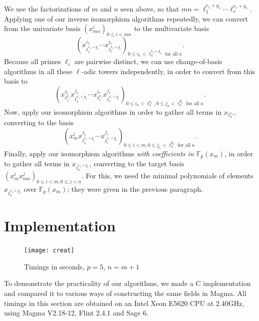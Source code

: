 \documentclass{sig-alternate}
\def\F {\ensuremath{\mathbb{F}}}
\newcounter{algo}
\begin{document}
We use the factorizations of $m$ and $n$ seen above, so that $mn =
\ell_1^{e_1+g_1} \cdots \ell_r^{e_r + g_r}$. Applying one of our
inverse isomorphism algorithms repeatedly, we can convert
from the univariate basis $(x_{mn}^i)_{0 \le i < mn}$ to
the multivariate basis 
$$(x^{i_1}_{\ell_1^{e_1+g_1}}\cdots x^{i_r}_{\ell_r^{e_r+g_r}})_{ 0\le i_\kappa < \ell_\kappa^{e_\kappa+g_\kappa}  \text{~for all $\kappa$}}.$$
Because all primes $\ell_i$ are pairwise distinct, we can use 
change-of-basis algorithms in all these $\ell$-adic towers independently, in
order to convert from this basis to
$$(x^{i_1}_{\ell_1^{e_1}} x^{j_1}_{\ell_1^{e_1+g_1}} 
\cdots x^{i_r}_{\ell_r^{e_r}} x^{j_r}_{\ell_r^{e_r+g_r}})_{ 
  0\le i_\kappa < \ell_\kappa^{e_\kappa},   0\le j_\kappa < \ell_\kappa^{g_\kappa} \text{~for all $\kappa$}}.$$
Now, apply our isomorphism algorithms in order to
gather all terms in $x_{\ell_\kappa^{e_\kappa}}$, converting
to the basis
$$(x_m^i x^{j_1}_{\ell_1^{e_1+g_1}} \cdots
x^{j_r}_{\ell_r^{e_r+g_r}})_{ 0\le i < m, 0\le j_\kappa <
  \ell_\kappa^{g_\kappa} \text{~for all $\kappa$}}.$$ Finally, apply
our isomorphism algorithms {\em with coefficients in $\F_p(x_m)$}, in
order to gather all terms in $x_{\ell_\kappa^{e_\kappa+g_\kappa}}$,
converting to the target basis $(x_m^i x_{mn}^j)_{0 \le i < m, 0 \le j
  < n}$.  For this, we need the minimal polynomials of elements
$x_{\ell_\kappa^{e_\kappa+g_\kappa}}$ over $\F_p(x_m)$;
they were given in the previous paragraph.



\section{Implementation}\label{sec:implem}

\begin{figure}
  \centering
  \texttt{[image: creat]}
  \caption{Timings in seconds, $p=5$, $n=m+1$}
  \label{fig:bench}
\vspace{-4ex}
\end{figure}

To demonstrate the practicality of our algorithms, we made a C
implementation and compared it to various ways of constructing the
same fields in Magma. All timings in this section are obtained on an
Intel Xeon E5620 CPU at 2.40GHz, using Magma V2.18-12, Flint 2.4.1 and
Sage 6.
\end{document}
